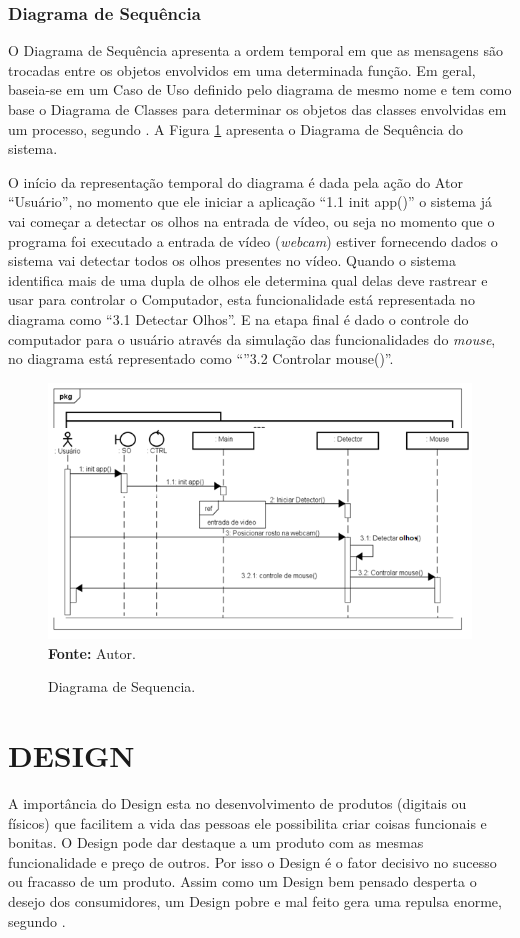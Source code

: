 \subsection{Diagrama de Sequência}
O Diagrama de Sequência apresenta a ordem temporal em que as mensagens são trocadas entre os objetos envolvidos em uma determinada função. Em geral, baseia-se em um Caso de Uso definido pelo diagrama de mesmo nome e tem como base o Diagrama de Classes para determinar os objetos das classes envolvidas em um processo, segundo . A Figura \ref{fig:diagrama-sequencia} apresenta o Diagrama de Sequência do sistema.

O início da representação temporal do diagrama é dada pela ação do Ator “Usuário”, no momento que ele iniciar a aplicação “1.1 init app()” o sistema já vai começar a detectar os olhos na entrada de vídeo, ou seja no momento que o programa foi executado a entrada de vídeo (\textit{webcam}) estiver fornecendo dados o sistema vai detectar todos os olhos presentes no vídeo. Quando o sistema identifica mais de uma dupla de olhos ele determina qual delas deve rastrear e usar para controlar o Computador, esta funcionalidade está representada no diagrama como “3.1 Detectar Olhos”. E na etapa final é dado o controle do computador para o usuário através da simulação das funcionalidades do \textit{mouse}, no diagrama está representado como “”3.2 Controlar mouse()”. 

\begin{figure}[htbp]
\caption{Diagrama de Sequencia.}
\centering \includegraphics[scale=1]{img/diagrama-sequencia.png}
\textbf{Fonte:} Autor.
\label{fig:diagrama-sequencia}
\end{figure}

\chapter{DESIGN}\label{CAP6}
A importância do Design esta no desenvolvimento de produtos (digitais ou físicos) que facilitem a vida das pessoas ele possibilita criar coisas funcionais e bonitas. O Design pode dar destaque a um produto com as mesmas funcionalidade e preço de outros. Por isso o Design é o fator decisivo no sucesso ou fracasso de um produto. Assim como um Design bem pensado desperta o desejo dos consumidores, um Design pobre e mal feito gera uma repulsa enorme, segundo .

